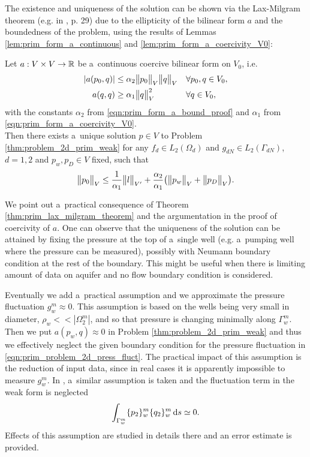 The existence and uniqueness of the solution can be shown via the Lax-Milgram theorem (e.g. in \cite{necas_direct_2012}, p. 29) due to the ellipticity
of the bilinear form $a$ and the boundedness of the problem, using the results of Lemmas \ref{lem:prim_form_a_continuous}
and \ref{lem:prim_form_a_coercivity_V0}:
\begin{theorem} \label{thm:prim_lax_milgram_theorem}
Let $a: V\times V \rightarrow \mathbb{R}$ be a~continuous coercive bilinear form on $V_0$, i.e.
\begin{align}
    \left|a(p_0,q)\right| &\leq \alpha_2 \bigl\Vert p_0\bigr\Vert_V \bigl\Vert q\bigr\Vert_V && \forall p_0,q \in V_0,\\
    a(q,q) &\geq \alpha_1 \bigl\Vert q\bigr\Vert^2_V && \forall q\in V_0,
\end{align}
with the constants $\alpha_2$ from \eqref{eqn:prim_form_a_bound_proof} and $\alpha_1$ from \eqref{eqn:prim_form_a_coercivity_V0}.\\
Then there exists a~unique solution $p\in V$ to Problem \eqref{thm:problem_2d_prim_weak} for any
$f_d\in L_2(\Omega_d)$ and $g_{dN}\in L_2(\Gamma_{dN})$, $d=1,2$ and $p_w, p_D\in V$ fixed, such that
\begin{equation}
    \bigl\Vert p_0\bigr\Vert_V \leq \frac{1}{\alpha_1} \bigl\Vert l\bigr\Vert_{V'} + \frac{\alpha_2}{\alpha_1}\big( \bigl\Vert p_w\bigr\Vert_V+\bigl\Vert p_D\bigr\Vert_V \big).
\end{equation}
\end{theorem}

%
We point out a~practical consequence of Theorem \ref{thm:prim_lax_milgram_theorem} and the argumentation in the proof of coercivity of $a$.
One can observe that the uniqueness of the solution can be attained by fixing the pressure at the top of a~single well
(e.g. a~pumping well where the pressure can be measured), possibly with Neumann boundary condition at the rest of the boundary.
This might be useful when there is limiting amount of data on aquifer and no flow boundary condition is considered.

Eventually we add a~practical assumption and we approximate the pressure fluctuation $g^m_w\approx 0$.
This assumption is based on the wells being very small in diameter, $\rho_w << |\Omega^m_2|$,
and so that pressure is changing minimally along $\Gamma^m_w$.
Then we put $a(p_w,q)\approx 0$ in Problem \eqref{thm:problem_2d_prim_weak}
and thus we effectively neglect the given boundary condition for the pressure fluctuation in \eqref{eqn:prim_problem_2d_press_fluct}.
The practical impact of this assumption is the reduction of input data, since in real cases
it is apparently impossible to measure $g^m_w$.
%
In \cite{koppl_vidotto_2018}, a~similar assumption is taken and the fluctuation term in the weak form is neglected
\begin{equation} \label{eqn:well_edge_fluctuation_neglect}
    \int_{\Gamma^m_w} \{p_2\}^m_w\{q_2\}^m_w \,{\rm d} s \simeq 0.
\end{equation}
Effects of this assumption are studied in details there and an error estimate is provided.


